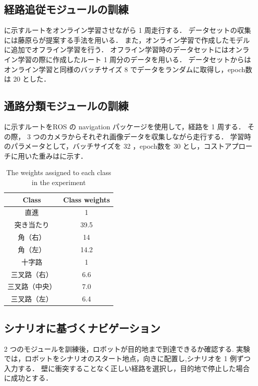 \clearpage
\subsection{経路追従モジュールの訓練}
に示すルートをオンライン学習させながら 1 周走行する．
データセットの収集には藤原ら\cite{fujiwara2023}が提案する手法を用いる．
また，オンライン学習で作成したモデルに追加でオフライン学習を行う．
オフライン学習時のデータセットにはオンライン学習の際に作成したルート 1 周分のデータを用いる．
データセットからはオンライン学習と同様のバッチサイズ 8 でデータをランダムに取得し，epoch数は 20 とした．

\subsection{通路分類モジュールの訓練}
に示すルートをROS の navigation パッケージを使用して，経路を 1 周する．
その際， 3 つのカメラからそれぞれ画像データを収集しながら走行する．
学習時のパラメータとして，バッチサイズを 32 ，epoch数を 30 とし，コストアプローチに用いた重みはに示す．

\begin{table}[htbp]
  \centering
  \caption{The weights assigned to each class in the experiment}\label{tab:cost}
  \begin{tabular}{c|c}
  \hline
  Class & Class weights\\
  \hline
  直進   & 1\\
  突き当たり   & 39.5\\
  角（右） & 14\\
  角（左）& 14.2 \\
  十字路 & 1  \\
  三叉路（右）& 6.6  \\
  三叉路（中央）& 7.0  \\
  三叉路（左） & 6.4  \\
  \hline
  \end{tabular}
\end{table}

\clearpage
\subsection{シナリオに基づくナビゲーション}
2 つのモジュールを訓練後，ロボットが目的地まで到達できるか確認する.
実験では，ロボットをシナリオのスタート地点，向きに配置し,シナリオを 1 例ずつ入力する．
壁に衝突することなく正しい経路を選択し，目的地で停止した場合に成功とする．